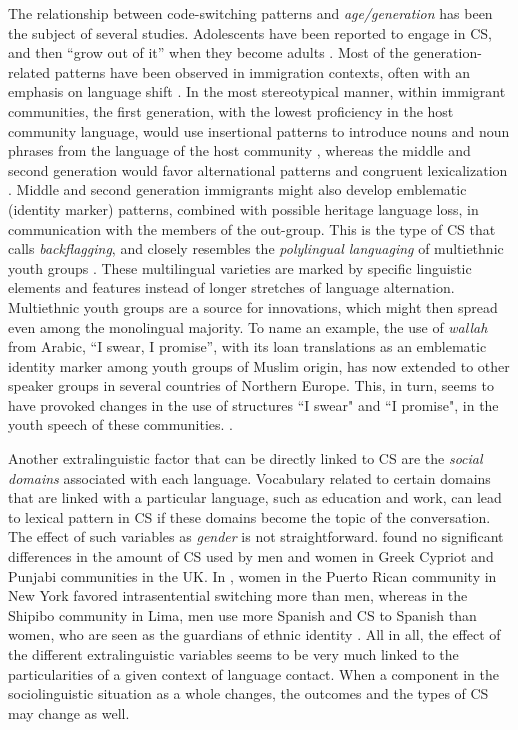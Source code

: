 \documentclass[output=paper,
modfonts
]{langscibook}
\begin{document}
The relationship between code-switching patterns and \textit{age/generation} has been the subject of several studies. Adolescents have been reported to engage in CS, and then “grow out of it” when they become adults \parencite[pp. 22]{muysken2000}. Most of the generation-related patterns have been observed in immigration contexts, often with an emphasis on language shift \parencite[pp. 227]{muysken2000, kovacs2001code}. In the most stereotypical manner, within immigrant communities, the first generation, with the lowest proficiency in the host community language, would use insertional patterns to introduce nouns and noun phrases from the language of the host community \parencite{muysken2013language}, whereas the middle and second generation would favor alternational patterns and congruent lexicalization \parencite{muysken2000}. Middle and second generation immigrants might also develop emblematic (identity marker) patterns, combined with possible heritage language loss, in communication with the members of the out-group. This is the type of CS that \cite{muysken2013language} calls \textit{backflagging}, and closely resembles the  \textit{polylingual languaging} of multiethnic youth groups \parencite{jorgensen2011polylanguaging}. These multilingual varieties are marked by specific linguistic elements and features instead of longer stretches of language alternation. Multiethnic youth groups are a source for innovations, which might then spread even among the monolingual majority. To name an example, the use of \textit{wallah} from Arabic, “I swear, I promise”, with its loan translations as an emblematic identity marker among youth groups of Muslim origin, has now extended to other speaker groups in several countries of Northern Europe. This, in turn, seems to have provoked changes in the use of structures “I swear" and “I promise", in the youth speech of these communities. \parencite{kallmeyer2003linguistic,schoonen2005street,svendsen2008multiethnolectal,lehtonen2015tyylitellen}.

Another extralinguistic factor that can be directly linked to CS are the \textit{social domains} associated with each language. Vocabulary related to certain domains that are linked with a particular language, such as education and work, can lead to lexical pattern in CS if these domains become the topic of the conversation. The effect of such variables as \textit{gender} is not straightforward. \cite[pp. 83]{gardner2009code} found no significant differences in the amount of CS used by men and women in Greek Cypriot and Punjabi communities in the UK. In \cite{poplack1980sometimes},  women in the Puerto Rican community in New York favored intrasentential switching more than men, whereas in the Shipibo community in Lima, men use more Spanish and CS to Spanish than women, who are seen as the guardians of ethnic identity \parencite{zavala2008enra}. All in all, the effect of the different extralinguistic variables seems to be very much linked to the particularities of a given context of language contact. When a component in the sociolinguistic situation as a whole changes, the outcomes and the types of CS may change as well.
\end{document}
